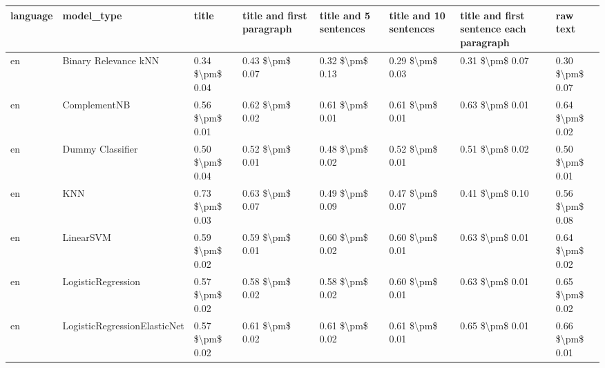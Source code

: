 \begin{tabular}{llllllll}
\toprule
language &                      model\_type &               title & title and first paragraph & title and 5 sentences & title and 10 sentences & title and first sentence each paragraph &            raw text \\
\midrule
      en &            Binary Relevance kNN &     0.34 \$\textbackslash pm\$ 0.04 &           0.43 \$\textbackslash pm\$ 0.07 &       0.32 \$\textbackslash pm\$ 0.13 &        0.29 \$\textbackslash pm\$ 0.03 &                         0.31 \$\textbackslash pm\$ 0.07 &     0.30 \$\textbackslash pm\$ 0.07 \\
      en &                    ComplementNB &     0.56 \$\textbackslash pm\$ 0.01 &           0.62 \$\textbackslash pm\$ 0.02 &       0.61 \$\textbackslash pm\$ 0.01 &        0.61 \$\textbackslash pm\$ 0.01 &                         0.63 \$\textbackslash pm\$ 0.01 &     0.64 \$\textbackslash pm\$ 0.02 \\
      en &                Dummy Classifier &     0.50 \$\textbackslash pm\$ 0.04 &           0.52 \$\textbackslash pm\$ 0.01 &       0.48 \$\textbackslash pm\$ 0.02 &        0.52 \$\textbackslash pm\$ 0.01 &                         0.51 \$\textbackslash pm\$ 0.02 &     0.50 \$\textbackslash pm\$ 0.01 \\
      en &                             KNN &     0.73 \$\textbackslash pm\$ 0.03 &           0.63 \$\textbackslash pm\$ 0.07 &       0.49 \$\textbackslash pm\$ 0.09 &        0.47 \$\textbackslash pm\$ 0.07 &                         0.41 \$\textbackslash pm\$ 0.10 &     0.56 \$\textbackslash pm\$ 0.08 \\
      en &                       LinearSVM &     0.59 \$\textbackslash pm\$ 0.02 &           0.59 \$\textbackslash pm\$ 0.01 &       0.60 \$\textbackslash pm\$ 0.02 &        0.60 \$\textbackslash pm\$ 0.01 &                         0.63 \$\textbackslash pm\$ 0.01 &     0.64 \$\textbackslash pm\$ 0.02 \\
      en &              LogisticRegression &     0.57 \$\textbackslash pm\$ 0.02 &           0.58 \$\textbackslash pm\$ 0.02 &       0.58 \$\textbackslash pm\$ 0.02 &        0.60 \$\textbackslash pm\$ 0.01 &                         0.63 \$\textbackslash pm\$ 0.01 &     0.65 \$\textbackslash pm\$ 0.02 \\
      en &    LogisticRegressionElasticNet &     0.57 \$\textbackslash pm\$ 0.02 &           0.61 \$\textbackslash pm\$ 0.02 &       0.61 \$\textbackslash pm\$ 0.02 &        0.61 \$\textbackslash pm\$ 0.01 &                         0.65 \$\textbackslash pm\$ 0.01 &     0.66 \$\textbackslash pm\$ 0.01 \\

\end{tabular}
